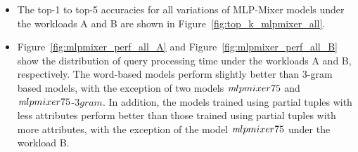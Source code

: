 \begin{itemize}
	\item The top-1 to top-5 accuracies for all variations of MLP-Mixer models under the workloads A and B are shown in Figure~\ref{fig:top_k_mlpmixer_all}.
	\item Figure~\ref{fig:mlpmixer_perf_all_A} and Figure~\ref{fig:mlpmixer_perf_all_B} show the distribution of query processing time under the workloads A and B, respectively.
	The word-based models perform slightly better than 3-gram based models, with the exception of two models $\emph mlpmixer75$ and $\emph mlpmixer75$-$3gram$.
	In addition, the models trained using partial tuples with less attributes perform better than those trained using partial tuples with more attributes, 
	with the exception of the model $\emph mlpmixer75$ under the workload B.
\end{itemize}

